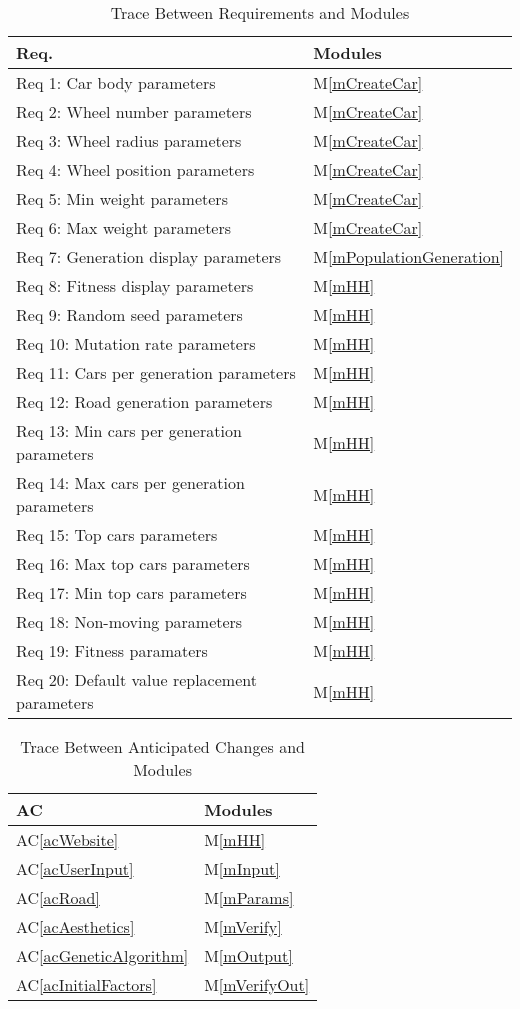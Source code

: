 \documentclass[12pt, titlepage]{article}
\newcommand{\acref}[1]{AC\ref{#1}}
\newcommand{\mref}[1]{M\ref{#1}}
\begin{document}
\begin{table}[H]
\centering
\begin{tabular}{p{} p{}}
\toprule
\textbf{Req.} & \textbf{Modules}\\
\midrule
Req 1: Car body parameters & \mref{mCreateCar}\\
Req 2: Wheel number parameters & \mref{mCreateCar}\\
Req 3: Wheel radius parameters & \mref{mCreateCar}\\
Req 4: Wheel position parameters & \mref{mCreateCar}\\
Req 5: Min weight parameters & \mref{mCreateCar}\\
Req 6: Max weight parameters & \mref{mCreateCar}\\
Req 7: Generation display parameters & \mref{mPopulationGeneration}\\
Req 8: Fitness display parameters & \mref{mHH}\\
Req 9: Random seed parameters & \mref{mHH}\\
Req 10: Mutation rate parameters & \mref{mHH}\\
Req 11: Cars per generation parameters &\mref{mHH}\\ 
Req 12: Road generation parameters & \mref{mHH}\\
Req 13: Min cars per generation parameters & \mref{mHH}\\
Req 14: Max cars per generation parameters & \mref{mHH}\\
Req 15: Top cars parameters & \mref{mHH}\\
Req 16: Max top cars parameters & \mref{mHH}\\
Req 17: Min top cars parameters & \mref{mHH}\\
Req 18: Non-moving parameters & \mref{mHH}\\
Req 19: Fitness paramaters & \mref{mHH}\\
Req 20: Default value replacement parameters & \mref{mHH}\\

\bottomrule
\end{tabular}
\caption{Trace Between Requirements and Modules}
\label{TblRT}
\end{table}

\begin{table}[H]
\centering
\begin{tabular}{p{} p{}}
\toprule
\textbf{AC} & \textbf{Modules}\\
\midrule
\acref{acWebsite} & \mref{mHH}\\
\acref{acUserInput} & \mref{mInput}\\
\acref{acRoad} & \mref{mParams}\\
\acref{acAesthetics} & \mref{mVerify}\\
\acref{acGeneticAlgorithm} & \mref{mOutput}\\
\acref{acInitialFactors} & \mref{mVerifyOut}\\
\bottomrule
\end{tabular}
\caption{Trace Between Anticipated Changes and Modules}
\label{TblACT}
\end{table}
\end{document}
